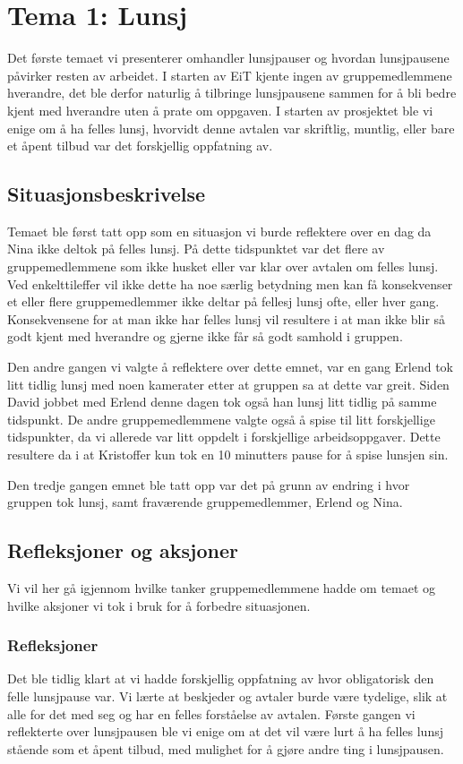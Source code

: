 \chapter{Tema 1: Lunsj}
Det første temaet vi presenterer omhandler lunsjpauser og hvordan lunsjpausene påvirker resten av arbeidet. I starten av EiT kjente ingen av gruppemedlemmene hverandre, det ble derfor naturlig å tilbringe lunsjpausene sammen for å bli bedre kjent med hverandre uten å prate om oppgaven. I starten av prosjektet ble vi enige om å ha felles lunsj, hvorvidt denne avtalen var skriftlig, muntlig, eller bare et åpent tilbud var det forskjellig oppfatning av.

\section{Situasjonsbeskrivelse}
Temaet ble først tatt opp som en situasjon vi burde reflektere over en dag da Nina ikke deltok på felles lunsj. På dette tidspunktet var det flere av gruppemedlemmene som ikke husket eller var klar over avtalen om felles lunsj. Ved enkelttileffer vil ikke dette ha noe særlig betydning men kan få konsekvenser et eller flere gruppemedlemmer ikke deltar på fellesj lunsj ofte, eller hver gang. Konsekvensene for at man ikke har felles lunsj vil resultere i at man ikke blir så godt kjent med hverandre og gjerne ikke får så godt samhold i gruppen. 

Den andre gangen vi valgte å reflektere over dette emnet, var en gang Erlend tok litt tidlig lunsj med noen kamerater etter at gruppen sa at dette var greit. Siden David jobbet med Erlend denne dagen tok også han lunsj litt tidlig på samme tidspunkt. De andre gruppemedlemmene valgte også å spise til litt forskjellige tidspunkter, da vi allerede var litt oppdelt i forskjellige arbeidsoppgaver. Dette resultere da i at Kristoffer kun tok en 10 minutters pause for å spise lunsjen sin. 

Den tredje gangen emnet ble tatt opp var det på grunn av endring i hvor gruppen tok lunsj, samt fraværende gruppemedlemmer, Erlend og Nina. 


\section{Refleksjoner og aksjoner}
Vi vil her gå igjennom hvilke tanker gruppemedlemmene hadde om temaet og hvilke aksjoner vi tok i bruk for å forbedre situasjonen.

\subsection*{Refleksjoner}
Det ble tidlig klart at vi hadde forskjellig oppfatning av hvor obligatorisk den felle lunsjpause var. Vi lærte at beskjeder og avtaler burde være tydelige, slik at alle for det med seg og har en felles forståelse av avtalen. Første gangen vi reflekterte over lunsjpausen ble vi enige om at det vil være lurt å ha felles lunsj stående som et åpent tilbud, med mulighet for å gjøre andre ting i lunsjpausen. 

